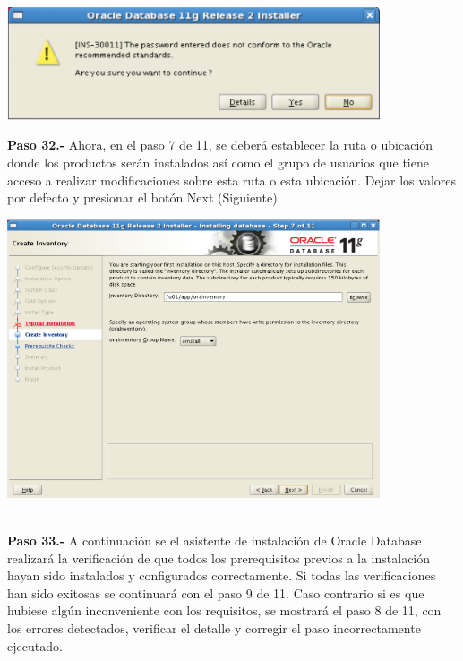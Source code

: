 \begin{enumerate}
\begin{center}
  \includegraphics[width=11cm]{Imagenes/Oracle_Database/Paso_31.png}
\end{center}
\break

\textbf {Paso 32.-} Ahora, en el paso 7 de 11, se deberá establecer la ruta o ubicación donde los productos serán instalados así como el grupo de usuarios que tiene acceso a realizar modificaciones sobre esta ruta o esta ubicación. Dejar los valores por defecto y presionar el botón Next (Siguiente)

\begin{center}
  \includegraphics[width=11cm]{Imagenes/Oracle_Database/Paso_32.png}
\end{center}
\vspace{12pt}\\

\textbf {Paso 33.-} A continuación se el asistente de instalación de Oracle Database realizará la verificación de que todos los prerequisitos previos a la instalación hayan sido instalados y configurados correctamente. Si todas las
verificaciones han sido exitosas se continuará con el paso 9 de 11. Caso contrario si es que hubiese algún inconveniente con los requisitos, se mostrará el paso 8 de 11, con los errores detectados, verificar el detalle y corregir el paso incorrectamente ejecutado.


\end{enumerate}
